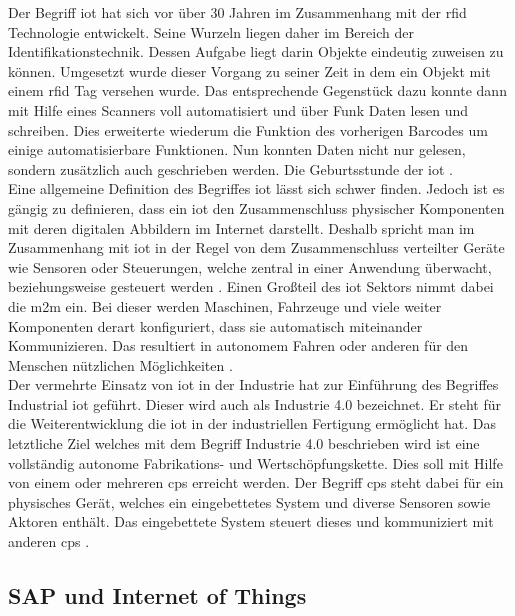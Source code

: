 \noindent Der Begriff \ac{iot} hat sich vor über 30 Jahren im Zusammenhang mit der \ac{rfid} Technologie entwickelt. Seine Wurzeln liegen daher im Bereich der Identifikationstechnik. Dessen Aufgabe liegt darin Objekte eindeutig zuweisen zu können. Umgesetzt wurde dieser Vorgang zu seiner Zeit in dem ein Objekt mit einem \ac{rfid} Tag versehen wurde. Das entsprechende Gegenstück dazu konnte dann mit Hilfe eines Scanners voll automatisiert und über Funk Daten lesen und schreiben. Dies erweiterte wiederum die Funktion des vorherigen Barcodes um einige automatisierbare Funktionen. Nun konnten Daten nicht nur gelesen, sondern zusätzlich auch geschrieben werden. Die Geburtsstunde der \ac{iot} \cite[Seite 37]{Holtschulte20:IOS}.\\
\noindent Eine allgemeine Definition des Begriffes \ac{iot} lässt sich schwer finden. Jedoch ist es gängig zu definieren, dass ein \ac{iot} den Zusammenschluss physischer Komponenten mit deren digitalen Abbildern im Internet darstellt. Deshalb spricht man im Zusammenhang mit \ac{iot} in der Regel von dem Zusammenschluss verteilter Geräte wie Sensoren oder Steuerungen, welche zentral in einer Anwendung überwacht, beziehungsweise gesteuert werden \cite[Seite 33]{Holtschulte20:IOS}. Einen Großteil des \ac{iot} Sektors nimmt dabei die \ac{m2m} ein. Bei dieser werden Maschinen, Fahrzeuge und viele weiter Komponenten derart konfiguriert, dass sie automatisch miteinander Kommunizieren. Das resultiert in autonomem Fahren oder anderen für den Menschen nützlichen Möglichkeiten \cite[Seite 449]{Holtschulte20:IOS}.\\
\noindent Der vermehrte Einsatz von \ac{iot} in der Industrie hat zur Einführung des Begriffes Industrial \ac{iot} geführt. Dieser wird auch als Industrie 4.0 bezeichnet. Er steht für die Weiterentwicklung die \ac{iot} in der industriellen Fertigung ermöglicht hat. Das letztliche Ziel welches mit dem Begriff Industrie 4.0 beschrieben wird ist eine vollständig autonome Fabrikations- und Wertschöpfungskette. Dies soll mit Hilfe von einem oder mehreren \ac{cps} erreicht werden. Der Begriff \ac{cps} steht dabei für ein physisches Gerät, welches ein eingebettetes System und diverse Sensoren sowie Aktoren enthält. Das eingebettete System steuert dieses und kommuniziert mit anderen \ac{cps} \cite[Seite 30f]{Schell17:INS}.\\

\subsection{SAP und Internet of Things}
\label{ss:grundlagen:sap}

